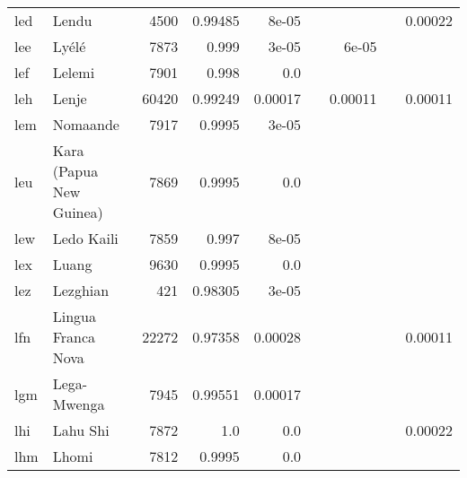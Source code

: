 \documentclass[11pt]{article}
\begin{document}
\begin{table*}[h]
{\begin{tabular}{llrrrrrrr}
led         & Lendu         & 4500         & 0.99485         & 8e-05         &          &          &          & 0.00022         \\

lee         & Lyélé         & 7873         & 0.999         & 3e-05         &          & 6e-05         &          &          \\

lef         & Lelemi         & 7901         & 0.998         & 0.0         &          &          &          &          \\

leh         & Lenje         & 60420         & 0.99249         & 0.00017         &          & 0.00011         &          & 0.00011         \\

lem         & Nomaande         & 7917         & 0.9995         & 3e-05         &          &          &          &          \\

leu         & Kara (Papua New Guinea)         & 7869         & 0.9995         & 0.0         &          &          &          &          \\

lew         & Ledo Kaili         & 7859         & 0.997         & 8e-05         &          &          &          &          \\

lex         & Luang         & 9630         & 0.9995         & 0.0         &          &          &          &          \\

lez         & Lezghian         & 421         & 0.98305         & 3e-05         &          &          &          &          \\

lfn         & Lingua Franca Nova         & 22272         & 0.97358         & 0.00028         &          &          &          & 0.00011         \\

lgm         & Lega-Mwenga         & 7945         & 0.99551         & 0.00017         &          &          &          &          \\

lhi         & Lahu Shi         & 7872         & 1.0         & 0.0         &          &          &          & 0.00022         \\

lhm         & Lhomi         & 7812         & 0.9995         & 0.0         &          &          &          &          \\


\end{tabular}}
\end{table*}
\end{document}
